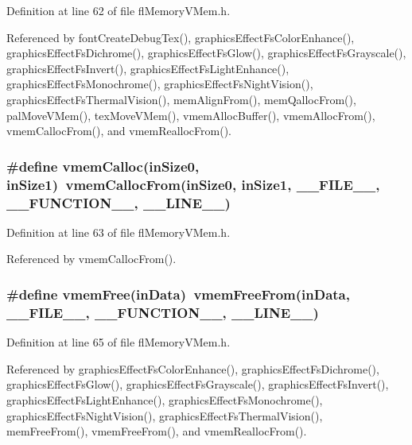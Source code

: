 Definition at line 62 of file fl\-Memory\-VMem.h.

Referenced by font\-Create\-Debug\-Tex(), graphics\-Effect\-Fs\-Color\-Enhance(), graphics\-Effect\-Fs\-Dichrome(), graphics\-Effect\-Fs\-Glow(), graphics\-Effect\-Fs\-Grayscale(), graphics\-Effect\-Fs\-Invert(), graphics\-Effect\-Fs\-Light\-Enhance(), graphics\-Effect\-Fs\-Monochrome(), graphics\-Effect\-Fs\-Night\-Vision(), graphics\-Effect\-Fs\-Thermal\-Vision(), mem\-Align\-From(), mem\-Qalloc\-From(), pal\-Move\-VMem(), tex\-Move\-VMem(), vmem\-Alloc\-Buffer(), vmem\-Alloc\-From(), vmem\-Calloc\-From(), and vmem\-Realloc\-From().
\subsubsection{\setlength{\rightskip}{0pt plus 5cm}\#define vmem\-Calloc(in\-Size0, in\-Size1)~vmem\-Calloc\-From(in\-Size0, in\-Size1, \_\-\_\-FILE\_\-\_\-, \_\-\_\-FUNCTION\_\-\_\-, \_\-\_\-LINE\_\-\_\-)}\label{flMemoryVMem_8h_91e7bdd218bc6db9829700d093ee1c41}




Definition at line 63 of file fl\-Memory\-VMem.h.

Referenced by vmem\-Calloc\-From().
\subsubsection{\setlength{\rightskip}{0pt plus 5cm}\#define vmem\-Free(in\-Data)~vmem\-Free\-From(in\-Data, \_\-\_\-FILE\_\-\_\-, \_\-\_\-FUNCTION\_\-\_\-, \_\-\_\-LINE\_\-\_\-)}\label{flMemoryVMem_8h_d4371239e3fb041c7b6cb866b9a31ad3}




Definition at line 65 of file fl\-Memory\-VMem.h.

Referenced by graphics\-Effect\-Fs\-Color\-Enhance(), graphics\-Effect\-Fs\-Dichrome(), graphics\-Effect\-Fs\-Glow(), graphics\-Effect\-Fs\-Grayscale(), graphics\-Effect\-Fs\-Invert(), graphics\-Effect\-Fs\-Light\-Enhance(), graphics\-Effect\-Fs\-Monochrome(), graphics\-Effect\-Fs\-Night\-Vision(), graphics\-Effect\-Fs\-Thermal\-Vision(), mem\-Free\-From(), vmem\-Free\-From(), and vmem\-Realloc\-From().
